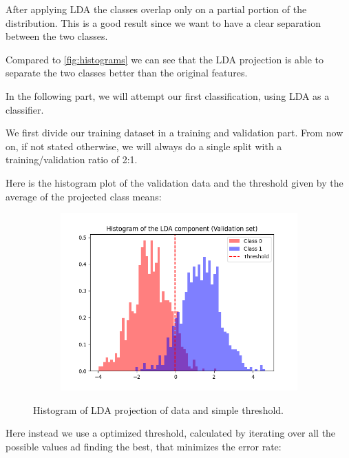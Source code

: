 \documentclass[12pt]{report}
\newcommand{\nnl}{%
    \newline
    \newline
}
\newcommand{\nl}{%
    \newline
    \noindent
}
\begin{document}
\noindent
After applying LDA the classes overlap only on a partial portion of the distribution. This is a good result since we want to have a clear separation between the two classes.
\nl
Compared to \autoref{fig:histograms} we can see that the LDA projection is able to separate the two classes better than the original features.
\nnl
In the following part, we will attempt our first classification, using LDA as a classifier.
\nl
We first divide our training dataset in a training and validation part. From now on, if not stated otherwise, we will always do a single split with a training/validation ratio of 2:1.
\nnl
Here is the histogram plot of the validation data and the threshold given by the average of the projected class means:
\begin{figure}[H]
    \centering
    \begin{subfigure}[t]{0.7\textwidth}
        \includegraphics[width=\textwidth]{./plot/dim_red/LDA_threshold_base.png}
    \end{subfigure}
    \caption{Histogram of LDA projection of data and simple threshold.}
    \label{fig:LDA_threshold_base}
\end{figure}
\noindent
Here instead we use a optimized threshold, calculated by iterating over all the possible values ad finding the best, that minimizes the error rate:
\end{document}
